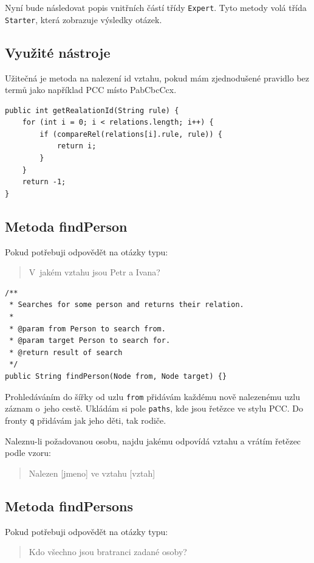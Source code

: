 \documentclass[a4paper, 12pt]{article}
\begin{document}
Nyní bude následovat popis vnitřních částí třídy \texttt{Expert}.
Tyto metody volá třída \texttt{Starter}, která zobrazuje výsledky otázek.

\subsection{Využité nástroje}
Užitečná je metoda na nalezení id vztahu, pokud mám zjednodušené
pravidlo bez termů jako například PCC místo PabCbcCcx.

\begin{verbatim}
public int getRealationId(String rule) {
    for (int i = 0; i < relations.length; i++) {
        if (compareRel(relations[i].rule, rule)) {
            return i;
        }
    }
    return -1;
}
\end{verbatim}

\subsection{Metoda findPerson}
Pokud potřebuji odpovědět na otázky typu:

\begin{quote}
V~jakém vztahu jsou Petr a Ivana?
\end{quote}

\begin{verbatim}
/**
 * Searches for some person and returns their relation.
 * 
 * @param from Person to search from.
 * @param target Person to search for.
 * @return result of search
 */
public String findPerson(Node from, Node target) {}
\end{verbatim}

Prohledáváním do šířky od uzlu \texttt{from} přidávám každému
nově nalezenému uzlu záznam o~jeho cestě. Ukládám si pole
\texttt{paths}, kde jsou řetězce ve stylu PCC. Do fronty \texttt{q}
přidávám jak jeho děti, tak rodiče.

Naleznu-li požadovanou osobu, najdu jakému odpovídá vztahu
a vrátím řetězec podle vzoru:

\begin{quote}
Nalezen  [jmeno] ve vztahu [vztah]
\end{quote}

\subsection{Metoda findPersons}
Pokud potřebuji odpovědět na otázky typu:

\begin{quote}
Kdo všechno jsou bratranci zadané osoby?
\end{quote}
\end{document}
